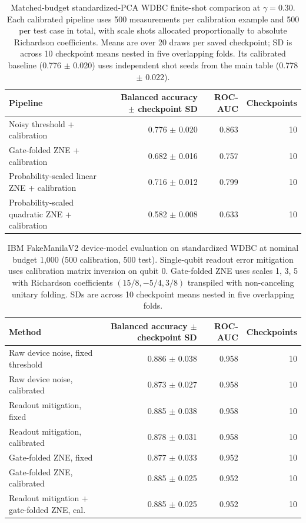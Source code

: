 \documentclass[conference]{IEEEtran}
\begin{document}
\begin{table}[t]\centering\small
\caption{Matched-budget standardized-PCA WDBC finite-shot comparison at $\gamma=0.30$. Each calibrated pipeline uses 500 measurements per calibration example and 500 per test case in total, with scale shots allocated proportionally to absolute Richardson coefficients. Means are over 20 draws per saved checkpoint; SD is across 10 checkpoint means nested in five overlapping folds. Its calibrated baseline (0.776 $\pm$ 0.020) uses independent shot seeds from the main table (0.778 $\pm$ 0.022).}
\label{tab:primary-gatefold}
\begin{tabular}{@{}l r r r@{}}\toprule
Pipeline & Balanced accuracy $\pm$ checkpoint SD & ROC-AUC & Checkpoints \\ \midrule
Noisy threshold + calibration & 0.776 $\pm$ 0.020 & 0.863 & 10 \\
Gate-folded ZNE + calibration & 0.682 $\pm$ 0.016 & 0.757 & 10 \\
Probability-scaled linear ZNE + calibration & 0.716 $\pm$ 0.012 & 0.799 & 10 \\
Probability-scaled quadratic ZNE + calibration & 0.582 $\pm$ 0.008 & 0.633 & 10 \\
\bottomrule\end{tabular}\end{table}

\begin{table}[t]\centering\small
\caption{IBM FakeManilaV2 device-model evaluation on standardized WDBC at nominal budget 1,000 (500 calibration, 500 test). Single-qubit readout error mitigation uses calibration matrix inversion on qubit 0. Gate-folded ZNE uses scales 1, 3, 5 with Richardson coefficients $(15/8, -5/4, 3/8)$ transpiled with non-canceling unitary folding. SDs are across 10 checkpoint means nested in five overlapping folds.}
\label{tab:fake-backend}
\begin{tabular}{@{}l r r r@{}}\toprule
Method & Balanced accuracy $\pm$ checkpoint SD & ROC-AUC & Checkpoints \\ \midrule
Raw device noise, fixed threshold & 0.886 $\pm$ 0.038 & 0.958 & 10 \\
Raw device noise, calibrated & 0.873 $\pm$ 0.027 & 0.958 & 10 \\
Readout mitigation, fixed & 0.885 $\pm$ 0.038 & 0.958 & 10 \\
Readout mitigation, calibrated & 0.878 $\pm$ 0.031 & 0.958 & 10 \\
Gate-folded ZNE, fixed & 0.877 $\pm$ 0.033 & 0.952 & 10 \\
Gate-folded ZNE, calibrated & 0.885 $\pm$ 0.025 & 0.952 & 10 \\
Readout mitigation + gate-folded ZNE, cal. & 0.885 $\pm$ 0.025 & 0.952 & 10 \\
\bottomrule\end{tabular}\end{table}
\end{document}
